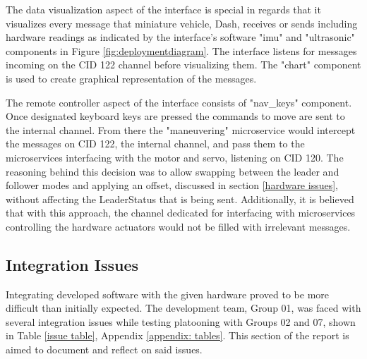 \documentclass[12pt]{article}
\begin{document}
The data visualization aspect of the interface is special in regards that it visualizes every message that miniature vehicle, Dash, receives or sends including hardware readings as indicated by the interface's software "imu" and "ultrasonic" components in Figure \ref{fig:deploymentdiagram}. The interface listens for messages incoming on the CID 122 channel before visualizing them. The "chart" component is used to create graphical representation of the messages. \par

The remote controller aspect of the interface consists of "nav\_keys" component. Once designated keyboard keys are pressed the commands to move are sent to the internal channel. From there the "maneuvering" microservice would intercept the messages on CID 122, the internal channel, and pass them to the microservices interfacing with the motor and servo, listening on CID 120. The reasoning behind this decision was to allow swapping between the leader and follower modes and applying an offset, discussed in section \ref{hardware issues}, without affecting the LeaderStatus that is being sent. Additionally, it is believed that with this approach, the channel dedicated for interfacing with microservices controlling the hardware actuators would not be filled with irrelevant messages.\par

\subsection{Integration Issues}\label{integration issues}
Integrating developed software with the given hardware proved to be more difficult than initially expected. The development team, Group 01, was faced with several integration issues while testing platooning with Groups 02 and 07, shown in Table \ref{issue table}, Appendix \ref{appendix: tables}. This section of the report is aimed to document and reflect on said issues.
\end{document}

